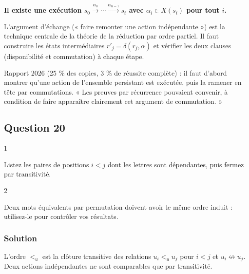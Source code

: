 \documentclass[11pt,a4paper]{article}
\begin{document}
\textbf{Il existe une exécution \(s_0\xrightarrow{\alpha_0}\cdots\xrightarrow{\alpha_{n-1}}s_t\) avec \(\alpha_i\in X(s_i)\) pour tout \(i\).}

\begin{methode}

L'argument d'échange (« faire remonter une action indépendante ») est la technique centrale de la théorie de la réduction par ordre partiel. Il faut construire les états intermédiaires \(r'_j=\delta(r_j,\alpha)\) et vérifier les deux clauses (disponibilité et commutation) à chaque étape.

\end{methode}

\begin{jury}

Rapport 2026 (25 \% des copies, 3 \% de réussite complète) : il faut d'abord montrer qu'une action de l'ensemble persistant est exécutée, puis la ramener en tête par commutations. « Les preuves par récurrence pouvaient convenir, à condition de faire apparaître clairement cet argument de commutation. »

\end{jury}

\hypertarget{question-20}{%
\subsection{Question 20}\label{question-20}}

\begin{indication}{1}

Listez les paires de positions \(i<j\) dont les lettres sont dépendantes, puis fermez par transitivité.

\end{indication}

\begin{indication}{2}

Deux mots équivalents par permutation doivent avoir le même ordre induit : utilisez-le pour contrôler vos résultats.

\end{indication}

\hypertarget{solution-19}{%
\subsubsection{Solution}\label{solution-19}}

L'ordre \(<_u\) est la clôture transitive des relations \(u_i<_uu_j\) pour \(i<j\) et \(u_i\not\leftrightarrow u_j\). Deux actions indépendantes ne sont comparables que par transitivité.
\end{document}
